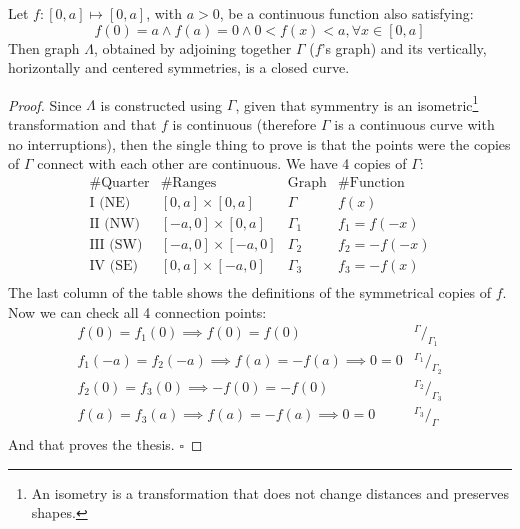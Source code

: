 \begin{proposition}
\label{lem:lclosed}
Let $f:[0,a] \mapsto [0,a]$, with $a > 0$, be a continuous function also satisfying:
\begin{equation}
\label{eq:fconds}
f(0)=a \wedge f(a)=0 \wedge 0 < f(x) < a, \forall x \in [0,a]
\end{equation}
Then graph $\Lambda$, obtained by adjoining together $\Gamma$ ($f$'s graph) and
its vertically, horizontally and centered symmetries, is a closed curve.
\begin{proof}
Since $\Lambda$ is constructed using $\Gamma$, given that symmentry is an 
isometric\footnote{An isometry is a transformation that does not change distances and
preserves shapes.} 
transformation and that $f$ is continuous (therefore $\Gamma$ is a continuous curve
with no interruptions), then the single thing to prove is that the points were
the copies of $\Gamma$ connect with each other are continuous. We have 4
copies of $\Gamma$:
\begin{equation*}
\begin{array}{c|c|c|c}
\text{\# Quarter} & \text{\# Ranges} & \text{Graph} & \text{\# Function} \\
\hline
\text{I (NE)} & [0,a] \times [0,a] & \Gamma & f(x) \\
\text{II (NW)} & [-a,0] \times [0,a] & \Gamma_1 & f_1 = f(-x) \\
\text{III (SW)} & [-a,0] \times [-a,0] & \Gamma_2 & f_2 = -f(-x) \\
\text{IV (SE)} & [0,a] \times [-a,0] & \Gamma_3 & f_3 = -f(x) \\
\end{array}
\end{equation*}
The last column of the table shows the definitions of the symmetrical copies of $f$.
Now we can check all 4 connection points:
\begin{equation}\label{eq:symms}
\begin{array}{l|c}
f(0) = f_1(0) \implies f(0) = f(0) & ^{\Gamma}/_{\Gamma_1} \\
f_1(-a) = f_2(-a) \implies f(a) = -f(a) \implies 0 = 0 & ^{\Gamma_1}/_{\Gamma_2} \\
f_2(0) = f_3(0) \implies -f(0) = -f(0) & ^{\Gamma_2}/_{\Gamma_3} \\
f(a) = f_3(a) \implies f(a) = -f(a) \implies 0 = 0 & ^{\Gamma_3}/_{\Gamma} \\
\end{array}
\end{equation}
And that proves the thesis.
$\square$
\end{proof}
\end{proposition}

